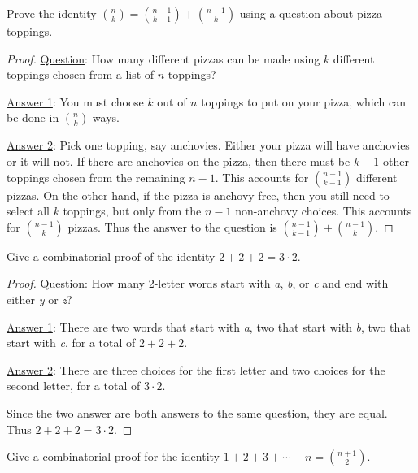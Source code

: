 \begin{questions}

\question Prove the identity ${n\choose k} = {n-1 \choose k-1} + {n-1 \choose k}$ using a question about pizza toppings.

	\begin{answer}
		\begin{proof}
			\underline{Question}: How many different pizzas can be made using $k$ different toppings chosen from a list of $n$ toppings?
			
			\underline{Answer 1}: You must choose $k$ out of $n$ toppings to put on your pizza, which can be done in ${n \choose k}$ ways.
			
			\underline{Answer 2}: Pick one topping, say anchovies.  Either your pizza will have anchovies or it will not.  If there are anchovies on the pizza, then there must be $k-1$ other toppings chosen from the remaining $n-1$.  This accounts for ${n-1 \choose k-1}$ different pizzas.  On the other hand, if the pizza is anchovy free, then you still need to select all $k$ toppings, but only from the $n-1$ non-anchovy choices.  This accounts for ${n-1 \choose k}$ pizzas.  Thus the answer to the question is ${n-1 \choose k-1} + {n-1 \choose k}$.
		\end{proof}
	\end{answer}
	
	
\question Give a combinatorial proof of the identity $2+2+2 = 3\cdot 2$.

	\begin{answer}
		\begin{proof}
		\underline{Question}: How many 2-letter words start with \textit{a}, \textit{b}, or \textit{c} and end with either \textit{y} or \textit{z}?
		
		\underline{Answer 1}: There are two words that start with \textit{a}, two that start with \textit{b}, two that start with \textit{c}, for a total of $2+2+2$.
		
		\underline{Answer 2}:  There are three choices for the first letter and two choices for the second letter, for a total of $3 \cdot 2$.
		
		Since the two answer are both answers to the same question, they are equal.  Thus $2 + 2 + 2 = 3\cdot 2$.
		\end{proof}
	\end{answer}	

\question Give a combinatorial proof for the identity $1 + 2 + 3 + \cdots + n = {n+1 \choose 2}$. 
	

\end{questions}
